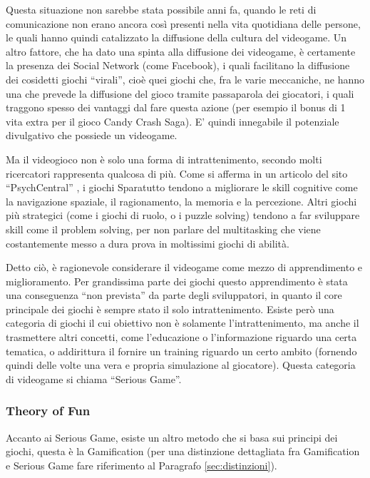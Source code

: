 Questa situazione non sarebbe stata possibile anni fa, quando le reti di comunicazione non erano ancora così presenti nella vita quotidiana delle persone, le quali hanno quindi catalizzato la diffusione della cultura del videogame. Un altro fattore, che ha dato una spinta alla diffusione dei videogame, è certamente la presenza dei Social Network (come Facebook), i quali facilitano la diffusione dei cosidetti giochi ``virali'', cioè quei giochi che, fra le varie meccaniche, ne hanno una che prevede la diffusione del gioco tramite passaparola dei giocatori, i quali traggono spesso dei vantaggi dal fare questa azione (per esempio il bonus di 1 vita extra per il gioco Candy Crash Saga). E' quindi innegabile il potenziale divulgativo che possiede un videogame.

Ma il videogioco non è solo una forma di intrattenimento, secondo molti ricercatori rappresenta qualcosa di più.
Come si afferma in un articolo del sito ``PsychCentral'' \cite{phychcentral}, i giochi Sparatutto tendono a migliorare le skill cognitive come la navigazione spaziale, il ragionamento, la memoria e la percezione. 
Altri giochi più strategici (come i giochi di ruolo, o i puzzle solving) tendono a far sviluppare skill come il problem solving, per non parlare del multitasking che viene costantemente messo a dura prova in moltissimi giochi di abilità.


Detto ciò, è ragionevole considerare il videogame come mezzo di apprendimento e miglioramento. Per grandissima parte dei giochi questo apprendimento è stata una conseguenza ``non prevista'' da parte degli sviluppatori, 
in quanto il core principale dei giochi è sempre stato il solo intrattenimento. Esiste però una categoria di giochi il cui obiettivo non è solamente l'intrattenimento, ma anche il trasmettere altri concetti, come l'educazione o l'informazione riguardo una certa tematica, o addirittura il fornire un training riguardo un certo ambito (fornendo quindi delle volte una vera e propria simulazione al giocatore). Questa categoria di videogame si chiama ``Serious Game''.

\subsubsection{Theory of Fun}

Accanto ai Serious Game, esiste un altro metodo che si basa sui principi dei giochi, questa è la Gamification (per una distinzione dettagliata fra Gamification e Serious Game fare riferimento al Paragrafo \ref{sec:distinzioni}).

